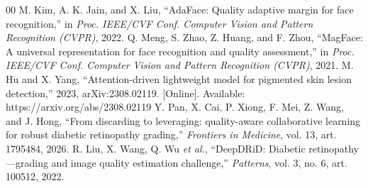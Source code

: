 \documentclass[conference]{IEEEtran}
\begin{document}
\begin{thebibliography}{00}
 M. Kim, A. K. Jain, and X. Liu, ``AdaFace: Quality adaptive margin for face recognition,'' in \emph{Proc. IEEE/CVF Conf. Computer Vision and Pattern Recognition (CVPR)}, 2022.
 Q. Meng, S. Zhao, Z. Huang, and F. Zhou, ``MagFace: A universal representation for face recognition and quality assessment,'' in \emph{Proc. IEEE/CVF Conf. Computer Vision and Pattern Recognition (CVPR)}, 2021.
 M. Hu and X. Yang, ``Attention-driven lightweight model for pigmented skin lesion detection,'' 2023, arXiv:2308.02119. [Online]. Available: https://arxiv.org/abs/2308.02119
 Y. Pan, X. Cai, P. Xiong, F. Mei, Z. Wang, and J. Hong, ``From discarding to leveraging: quality-aware collaborative learning for robust diabetic retinopathy grading,'' \emph{Frontiers in Medicine}, vol. 13, art. 1795484, 2026.
 R. Liu, X. Wang, Q. Wu \emph{et al.}, ``DeepDRiD: Diabetic retinopathy---grading and image quality estimation challenge,'' \emph{Patterns}, vol. 3, no. 6, art. 100512, 2022.
\end{thebibliography}
\end{document}
